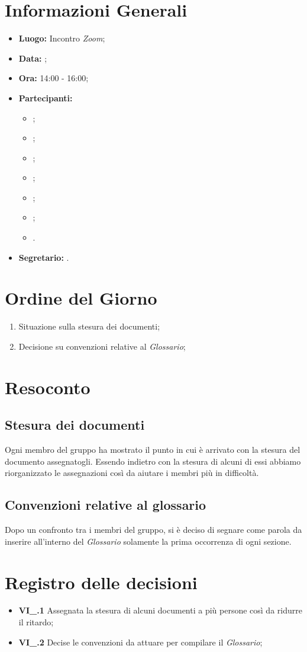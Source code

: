 \section{Informazioni Generali}
\begin{itemize}
\item \textbf{Luogo:} Incontro \textit{Zoom};
\item \textbf{Data:} \Data;
\item \textbf{Ora:} 14:00 - 16:00;
\item \textbf{Partecipanti:}
	\begin{itemize}
		\item \BL{}; 
		\item \FF{};
		\item \MM{}; 
		\item \PC{};
		\item \TG{};
		\item \TL{};
		\item \VD{}.
	\end{itemize} 
\item \textbf{Segretario:} \PC{}.
\end{itemize}

\section{Ordine del Giorno}
\begin{enumerate}
 \item Situazione sulla stesura dei documenti;
 \item Decisione su convenzioni relative al \textit{Glossario};
\end{enumerate}

\section{Resoconto}
\subsection{Stesura dei documenti}
Ogni membro del gruppo ha mostrato il punto in cui è arrivato con la stesura del documento assegnatogli. Essendo indietro con la stesura di alcuni di essi abbiamo riorganizzato le assegnazioni così da aiutare i membri più in difficoltà.

\subsection{Convenzioni relative al glossario}
Dopo un confronto tra i membri del gruppo, si è deciso di segnare come parola da inserire all'interno del \textit{Glossario} solamente la prima occorrenza di ogni sezione.

\section{Registro delle decisioni}
\begin{itemize}
  \item \textbf{VI\_\Data.1} Assegnata la stesura di alcuni documenti a più persone così da ridurre il ritardo;
  \item \textbf{VI\_\Data.2} Decise le convenzioni da attuare per compilare il \textit{Glossario};
\end{itemize}
